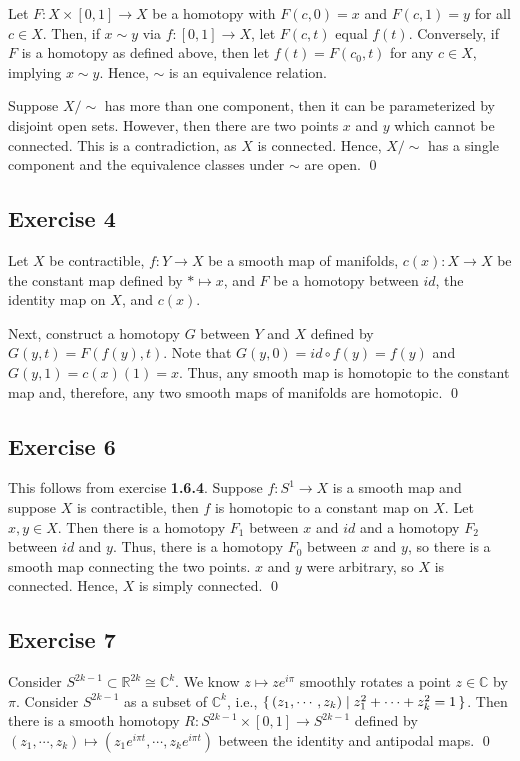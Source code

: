 \documentclass{article}
\newcommand{\R}{\mathbb{R}}
\newcommand{\C}{\mathbb{C}}
\begin{document}
    Let $F\colon X\times[0,1]\to X$ be a homotopy with $F(c,0)=x$ and $F(c,1)=y$
    for all $c\in X$. Then, if $x\sim y$ via $f\colon[0,1]\to X$, let $F(c,t)$
    equal $f(t)$. Conversely, if $F$ is a homotopy as defined above, then let
    $f(t)=F(c_0,t)$ for any $c\in X$, implying $x\sim y$. Hence, $\sim$ is an
    equivalence relation.

    Suppose $X/{\sim}$ has more than one component, then it can be parameterized
    by disjoint open sets. However, then there are two points $x$ and $y$ which
    cannot be connected. This is a contradiction, as $X$ is connected. Hence,
    $X/{\sim}$ has a single component and the equivalence classes under $\sim$
    are open.
    \qed

  \subsection*{Exercise 4}
    Let $X$ be contractible, $f\colon Y\to X$ be a smooth map of manifolds,
    $c(x)\colon X\to X$ be the constant map defined by $*\mapsto x$, and $F$ be
    a homotopy between $id$, the identity map on $X$, and $c(x)$.

    Next, construct a homotopy $G$ between $Y$ and $X$ defined by
    $G(y,t)=F(f(y),t)$. Note that $G(y,0)=id\circ f(y)=f(y)$ and $G(y,1)=
    c(x)(1)=x$. Thus, any smooth map is homotopic to the constant map and,
    therefore, any two smooth maps of manifolds are homotopic.
    \qed

  \subsection*{Exercise 6}
    This follows from exercise \textbf{1.6.4}. Suppose $f\colon S^1\to X$ is a
    smooth map and suppose $X$ is contractible, then $f$ is homotopic to a
    constant map on $X$. Let $x,y\in X$. Then there is a homotopy $F_1$ between
    $x$ and $id$ and a homotopy $F_2$ between $id$ and $y$. Thus, there is a
    homotopy $F_0$ between $x$ and $y$, so there is a smooth map connecting the
    two points. $x$ and $y$ were arbitrary, so $X$ is connected. Hence, $X$ is
    simply connected.
    \qed

  \subsection*{Exercise 7}
    Consider $S^{2k-1}\subset\R^{2k}\cong\C^k$. We know $z\mapsto ze^{i\pi}$
    smoothly rotates a point $z\in\C$ by $\pi$. Consider $S^{2k-1}$ as a subset
    of $\C^k$, i.e., $\set{(z_1,\cdots,z_k)\mid z_1^2+\cdots+z_k^2=1}$. Then
    there is a smooth homotopy $R\colon S^{2k-1}\times[0,1]\to S^{2k-1}$ defined
    by $(z_1,\cdots,z_k)\mapsto(z_1e^{i\pi{t}},\cdots,z_ke^{i\pi{t}})$ between
    the identity and antipodal maps.
    \qed
\end{document}
